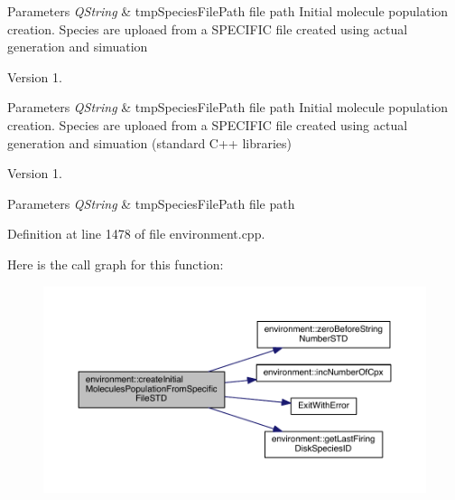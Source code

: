 \begin{DoxyParams}{Parameters}
{\em Q\+String} & tmp\+Species\+File\+Path file path Initial molecule population creation. Species are uploaed from a S\+P\+E\+C\+I\+F\+I\+C file created using actual generation and simuation \\
\hline
\end{DoxyParams}
\begin{DoxyVersion}{Version}
1. 
\end{DoxyVersion}

\begin{DoxyParams}{Parameters}
{\em Q\+String} & tmp\+Species\+File\+Path file path Initial molecule population creation. Species are uploaed from a S\+P\+E\+C\+I\+F\+I\+C file created using actual generation and simuation (standard C++ libraries) \\
\hline
\end{DoxyParams}
\begin{DoxyVersion}{Version}
1. 
\end{DoxyVersion}

\begin{DoxyParams}{Parameters}
{\em Q\+String} & tmp\+Species\+File\+Path file path \\
\hline
\end{DoxyParams}


Definition at line 1478 of file environment.\+cpp.



Here is the call graph for this function\+:\nopagebreak
\begin{figure}[H]
\begin{center}
\leavevmode
\includegraphics[width=350pt]{a00013_aa70e1394bf2240f6e5f14d4cbf369a3b_cgraph}
\end{center}
\end{figure}



